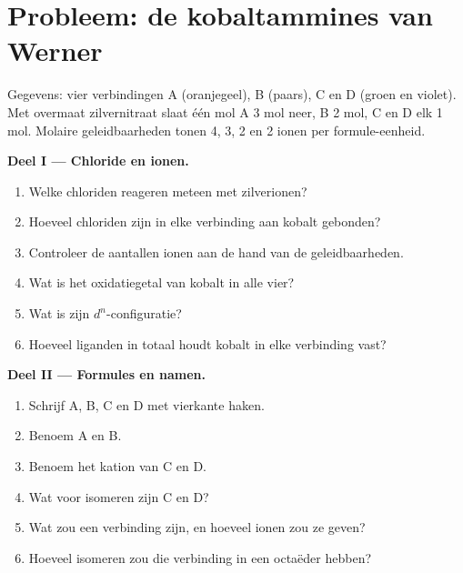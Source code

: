 \section{Probleem: de kobaltammines van Werner}

\begin{problem}
\label{pb:b2:coordination-complexes:1}
Gegevens: vier verbindingen A  (oranjegeel), B 
(paars), C en D  (groen en violet). Met overmaat zilvernitraat
slaat één mol A 3 mol  neer, B 2 mol, C en D elk 1 mol. Molaire
geleidbaarheden tonen 4, 3, 2 en 2 ionen per formule-eenheid.

\medskip
\noindent\textbf{Deel I --- Chloride en ionen.}
\begin{enumerate}
  \item Welke chloriden reageren meteen met zilverionen?
  \item Hoeveel chloriden zijn in elke verbinding aan kobalt gebonden?
  \item Controleer de aantallen ionen aan de hand van de geleidbaarheden.
  \item Wat is het oxidatiegetal van kobalt in alle vier?
  \item Wat is zijn $d^n$-configuratie?
  \item Hoeveel liganden in totaal houdt kobalt in elke verbinding vast?
\end{enumerate}

\medskip
\noindent\textbf{Deel II --- Formules en namen.}
\begin{enumerate}[resume]
  \item Schrijf A, B, C en D met vierkante haken.
  \item Benoem A en B.
  \item Benoem het kation van C en D.
  \item Wat voor isomeren zijn C en D?
  \item Wat zou een verbinding  zijn, en hoeveel ionen zou ze geven?
  \item Hoeveel isomeren zou die verbinding in een octaëder hebben?
\end{enumerate}


\end{problem}
